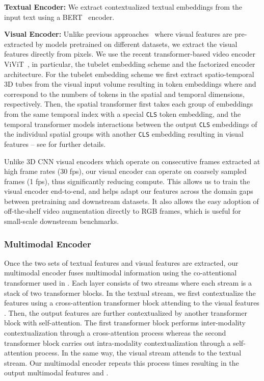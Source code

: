 \documentclass[10pt,twocolumn,letterpaper]{article}
\begin{document}
\noindent\textbf{Textual Encoder:} 
We extract  contextualized textual embeddings  from the input text using a BERT~\cite{devlin2018bert} encoder.

\noindent\textbf{Visual Encoder:} 
Unlike previous approaches~\cite{sun2019videobert, luo2020univl, huang2020multimodal, seo2021look} where visual features are pre-extracted by models pretrained on different datasets, we extract the visual features directly from pixels.
We use the recent transformer-based video encoder ViViT~\cite{arnab2021vivit}, in particular, the tubelet embedding scheme and the factorized encoder architecture. 
For the tubelet embedding scheme we first extract spatio-temporal 3D tubes from the visual input volume resulting in  token embeddings where  and  correspond to the numbers of tokens in the spatial and temporal dimensions, respectively.
Then, the spatial transformer first takes each group of  embeddings from the same temporal index with a special \texttt{CLS} token embedding, and the temporal transformer models interactions between the output \texttt{CLS} embeddings of the individual spatial groups with another \texttt{CLS} embedding resulting in  visual features  -- see \cite{arnab2021vivit} for further details. 

Unlike 3D CNN visual encoders which operate on consecutive frames extracted at high frame rates (30 fps), our visual encoder can operate on coarsely sampled frames (1 fps), thus significantly reducing compute. This allows us to train the visual encoder end-to-end, and helps adapt our features across the domain gaps between pretraining and downstream datasets. It also allows the easy adoption of off-the-shelf video augmentation directly to RGB frames, which is useful for small-scale downstream benchmarks.

\subsubsection{Multimodal Encoder}
Once the two sets of textual features  and visual features  are extracted, our multimodal encoder fuses multimodal information using the co-attentional transformer used in \cite{lu2019vilbert,seo2021look}.
Each layer consists of two streams where each stream is a stack of two transformer blocks.
In the textual stream, we first contextualize the features  using a cross-attention transformer block attending to the visual features .
Then, the output features are further contextualized by another transformer block with self-attention.
The first transformer block performs inter-modality contextualization through a cross-attention process whereas the second transformer block carries out intra-modality contextualization through a self-attention process.
In the same way, the visual stream  attends to the textual stream. 
Our multimodal encoder repeats this process  times resulting in the output multimodal features  and .
\end{document}
